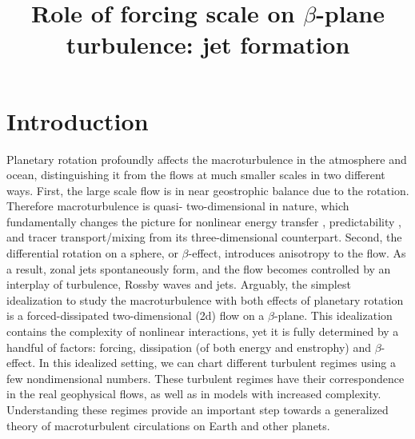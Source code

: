 \documentclass{ametsoc}
\title{Role of forcing scale on $\beta$-plane turbulence: jet formation}
\affiliation{Atmospheric and Oceanic Sciences Program, Princeton University, Princeton, New Jersey}
\begin{document}
\maketitle


%
\section{Introduction}

Planetary rotation profoundly affects the macroturbulence in the
atmosphere and ocean, distinguishing it from the flows at much smaller
scales in two different ways. First, the large scale flow is in near
geostrophic balance due to the rotation. Therefore macroturbulence
is quasi- two-dimensional in nature, which fundamentally changes the
picture for nonlinear energy transfer \citep{Kraichnan1967,Charney1971},
predictability \citep{Leith1971,Leith1972}, and tracer transport/mixing
\citep{Batchelor1959,Shuckburgh2003} from its three-dimensional counterpart.
Second, the differential rotation on a sphere, or $\beta$-effect,
introduces anisotropy to the flow. As a result, zonal jets spontaneously
form, and the flow becomes controlled by an interplay of turbulence, Rossby waves
and jets. Arguably, the simplest idealization to study the macroturbulence
with both effects of planetary rotation is a forced-dissipated two-dimensional
(2d) flow on a $\beta$-plane. This idealization contains the complexity
of nonlinear interactions, yet it is fully determined by a handful
of factors: forcing, dissipation (of both energy and enstrophy) and
$\beta$-effect. In this idealized setting, we can chart
different turbulent regimes using a few nondimensional numbers.
These turbulent regimes have their correspondence in the real geophysical
flows, as well as in models with increased complexity. Understanding
these regimes provide an important step towards a generalized theory 
of macroturbulent circulations on Earth and other planets.
\end{document}
